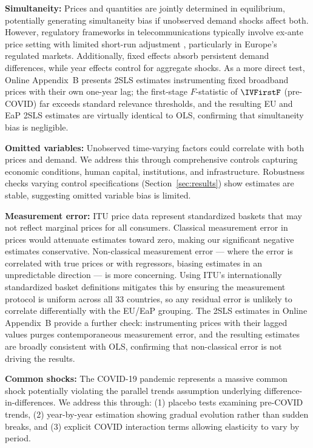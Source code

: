 \textbf{Simultaneity:} Prices and quantities are jointly determined in equilibrium, potentially generating simultaneity bias if unobserved demand shocks affect both. However, regulatory frameworks in telecommunications typically involve ex-ante price setting with limited short-run adjustment \citep{laffont2000competition}, particularly in Europe's regulated markets. Additionally, fixed effects absorb persistent demand differences, while year effects control for aggregate shocks. As a more direct test, Online Appendix~B presents 2SLS estimates instrumenting fixed broadband prices with their own one-year lag; the first-stage $F$-statistic of $\IVFirstF$ (pre-COVID) far exceeds standard relevance thresholds, and the resulting EU and EaP 2SLS estimates are virtually identical to OLS, confirming that simultaneity bias is negligible.

\textbf{Omitted variables:} Unobserved time-varying factors could correlate with both prices and demand. We address this through comprehensive controls capturing economic conditions, human capital, institutions, and infrastructure. Robustness checks varying control specifications (Section~\ref{sec:results}) show estimates are stable, suggesting omitted variable bias is limited.

\textbf{Measurement error:} ITU price data represent standardized baskets that may not reflect marginal prices for all consumers. Classical measurement error in prices would attenuate estimates toward zero, making our significant negative estimates conservative. Non-classical measurement error --- where the error is correlated with true prices or with regressors, biasing estimates in an unpredictable direction --- is more concerning. Using ITU's internationally standardized basket definitions mitigates this by ensuring the measurement protocol is uniform across all 33 countries, so any residual error is unlikely to correlate differentially with the EU/EaP grouping. The 2SLS estimates in Online Appendix~B provide a further check: instrumenting prices with their lagged values purges contemporaneous measurement error, and the resulting estimates are broadly consistent with OLS, confirming that non-classical error is not driving the results.

\textbf{Common shocks:} The COVID-19 pandemic represents a massive common shock potentially violating the parallel trends assumption underlying difference-in-differences. We address this through: (1) placebo tests examining pre-COVID trends, (2) year-by-year estimation showing gradual evolution rather than sudden breaks, and (3) explicit COVID interaction terms allowing elasticity to vary by period.

